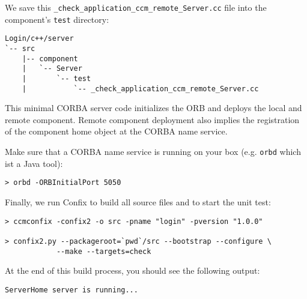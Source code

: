 We save this {\tt \_check\_application\_ccm\_remote\_Server.cc} file
into the component's {\tt test} directory:
\begin{footnotesize}
\begin{verbatim}
Login/c++/server
`-- src
    |-- component
    |   `-- Server
    |       `-- test
    |           `-- _check_application_ccm_remote_Server.cc
\end{verbatim}
\end{footnotesize}

This minimal CORBA server code initializes the ORB and deploys the local and
remote component. Remote component deployment also implies the registration of
the component home object at the CORBA name service. 

\vspace{3mm}
Make sure that a CORBA name service is running on your box (e.g. {\tt orbd}
which ist a Java tool):
\begin{footnotesize}
\begin{verbatim}
> orbd -ORBInitialPort 5050
\end{verbatim}
\end{footnotesize}

Finally, we run Confix to build all source files and to start the unit test:
\begin{footnotesize}
\begin{verbatim}
> ccmconfix -confix2 -o src -pname "login" -pversion "1.0.0"

> confix2.py --packageroot=`pwd`/src --bootstrap --configure \
            --make --targets=check
\end{verbatim}
\end{footnotesize}

At the end of this build process, you should see the following output:
\begin{footnotesize}
\begin{verbatim}
ServerHome server is running...
\end{verbatim}
\end{footnotesize}


